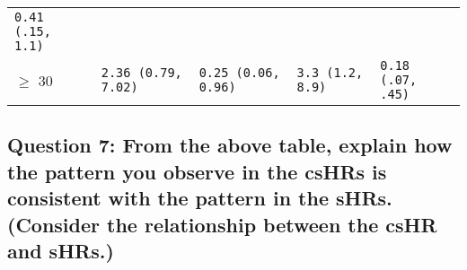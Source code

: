\documentclass[]{article}
\begin{document}
\begin{longtable}[]{@{}lllll@{}}
\begin{minipage}[t]{0.19\columnwidth}
\tt{0.41} (.15, 1.1)\strut
\end{minipage}\tabularnewline
\begin{minipage}[t]{0.10\columnwidth}\raggedright\strut
\(\ge\) 30\strut
\end{minipage} & \begin{minipage}[t]{0.20\columnwidth}\raggedright\strut
\tt{2.36} (\tt{0.79}, \tt{7.02})\strut
\end{minipage} & \begin{minipage}[t]{0.20\columnwidth}\raggedright\strut
\tt{0.25} (\tt{0.06}, \tt{0.96})\strut
\end{minipage} & \begin{minipage}[t]{0.19\columnwidth}\raggedright\strut
\tt{3.3} (1.2, 8.9)\strut
\end{minipage} & \begin{minipage}[t]{0.19\columnwidth}\raggedright\strut
\tt{0.18} (.07, .45)\strut
\end{minipage}\tabularnewline
\bottomrule
\end{longtable}

\vspace{12pt}

\subsection{Question 7: From the above table, explain how the pattern
you observe in the csHRs is consistent with the pattern in the sHRs.
(Consider the relationship between the csHR and
sHRs.)}\label{question-7-from-the-above-table-explain-how-the-pattern-you-observe-in-the-cshrs-is-consistent-with-the-pattern-in-the-shrs.-consider-the-relationship-between-the-cshr-and-shrs.}
\end{document}
